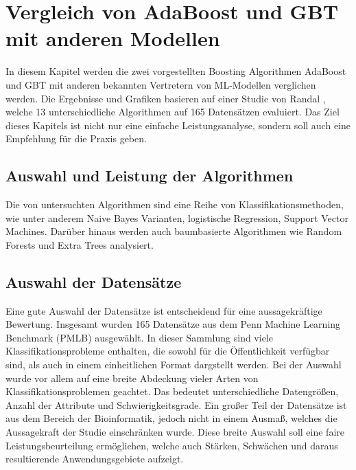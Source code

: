 \section {Vergleich von AdaBoost und GBT mit anderen Modellen}
In diesem Kapitel werden die zwei vorgestellten Boosting Algorithmen AdaBoost und GBT mit anderen bekannten Vertretern von ML-Modellen verglichen werden. Die Ergebnisse und Grafiken basieren auf einer Studie von Randal \textcite{Olson2018}, welche 13 unterschiedliche Algorithmen auf 165 Datensätzen evaluiert. Das Ziel dieses Kapitels ist nicht nur eine einfache Leistungsanalyse, sondern soll auch eine Empfehlung für die Praxis geben.

\subsection{Auswahl und Leistung der Algorithmen}
Die von \textcite{Olson2018} untersuchten Algorithmen sind eine Reihe von Klassifikationsmethoden, wie unter anderem Naive Bayes Varianten, logistische Regression, Support Vector Machines. Darüber hinaus werden auch baumbasierte Algorithmen wie Random Forests und Extra Trees analysiert. 

\subsection{Auswahl der Datensätze}
Eine gute Auswahl der Datensätze ist entscheidend für eine aussagekräftige Bewertung. Insgesamt wurden 165 Datensätze aus dem Penn Machine Learning Benchmark (PMLB) ausgewählt. In dieser Sammlung sind viele Klassifikationsprobleme enthalten, die sowohl für die Öffentlichkeit verfügbar sind, als auch in einem einheitlichen Format dargstellt werden.
\newline
Bei der Auswahl wurde vor allem auf eine breite Abdeckung vieler Arten von Klassifikationsproblemen geachtet. Das bedeutet unterschiedliche Datengrößen, Anzahl der Attribute und Schwierigkeitsgrade. Ein großer Teil der Datensätze ist aus dem Bereich der Bioinformatik, jedoch nicht in einem Ausmaß, welches die Aussagekraft der Studie einschränken wurde. Diese breite Auswahl soll eine faire Leistungsbeurteilung ermöglichen, welche auch Stärken, Schwächen und daraus resultierende Anwendungsgebiete aufzeigt.


